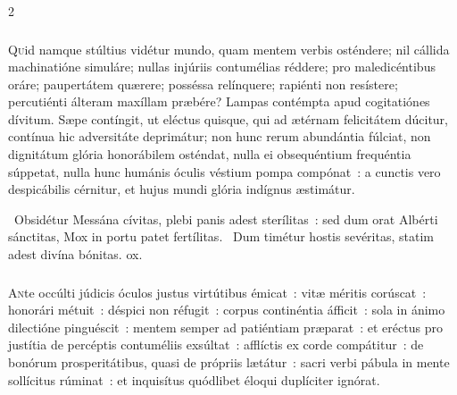 \documentclass[9pt,twoside]{extarticle}
\begin{document}
\begin{multicols}{2}
{{\subsubsection*{\center {}}
\lettrine{Q}uid namque stúltius vidétur mundo, quam mentem verbis osténdere; nil cállida machinatióne simuláre; nullas injúriis contumélias réddere; pro maledicéntibus oráre; paupertátem quærere; posséssa relínquere; rapiénti non resístere; percutiénti álteram maxíllam præbére? Lampas contémpta apud cogitatiónes dívitum. Sæpe contíngit, ut eléctus quisque, qui ad ætérnam felicitátem dúcitur, contínua hic adversitáte deprimátur; non hunc rerum abundántia fúlciat, non dignitátum glória honorábilem osténdat, nulla ei obsequéntium frequéntia súppetat, nulla hunc humánis óculis véstium pompa compónat~: a cunctis vero despicábilis cérnitur, et hujus mundi glória indígnus æstimátur.

\begin{tightlist}{}
\item {}~Obsidétur Messána cívitas, plebi panis adest sterílitas~: sed dum orat Albérti sánctitas, \textred{*} Mox in portu patet fertílitas.
~Dum timétur hostis sevéritas, statim adest divína bónitas. ox.
\end{tightlist}

\subsubsection*{\center {}}
\lettrine{A}nte occúlti júdicis óculos justus virtútibus émicat~: vitæ méritis corúscat~: honorári métuit~: déspici non réfugit~: corpus continéntia áfficit~: sola in ánimo dilectióne pinguéscit~: mentem semper ad patiéntiam præparat~: et eréctus pro justítia de percéptis contuméliis exsúltat~: afflíctis ex corde compátitur~: de bonórum prosperitátibus, quasi de própriis lætátur~: sacri verbi pábula in mente sollícitus rúminat~: et inquisítus quódlibet éloqui duplíciter ignórat.

}}
\end{multicols}
\end{document}
